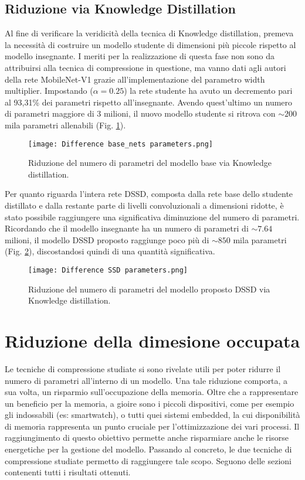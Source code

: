 \subsection{Riduzione via Knowledge Distillation}
Al fine di verificare la veridicità della tecnica di Knowledge distillation, premeva la necessità di costruire un modello studente di dimensioni più piccole rispetto al modello insegnante. I meriti per la realizzazione di questa fase non sono da attribuirsi alla tecnica di compressione in questione, ma vanno dati agli autori della rete MobileNet-V1 grazie all'implementazione del parametro width multiplier.
Impostando  ($\alpha=0.25$) la rete studente ha avuto un decremento pari al 93,31\% dei parametri rispetto all'insegnante. Avendo quest'ultimo un numero di parametri maggiore di 3 milioni, il nuovo modello studente si ritrova con $\sim{200}$ mila parametri allenabili (Fig. \ref{base_net_par}).
\begin{figure}
    \centering
    \texttt{[image: Difference base\_nets parameters.png]}
    \centering
    \caption{Riduzione del numero di parametri del modello base via Knowledge distillation.}
    \label{base_net_par}
\end{figure}
Per quanto riguarda l'intera rete DSSD, composta dalla rete base dello studente distillato e dalla restante parte di livelli convoluzionali a dimensioni ridotte, è stato possibile raggiungere una significativa diminuzione del numero di parametri. Ricordando che il modello insegnante ha un numero di parametri di $\sim{7.64}$ milioni, il modello DSSD proposto raggiunge poco più di $\sim{850}$ mila parametri (Fig. \ref{SSD_par}), discostandosi quindi di una quantità significativa.
\begin{figure}
    \centering
    \texttt{[image: Difference SSD parameters.png]}
    \centering
    \caption{Riduzione del numero di parametri del modello proposto DSSD via Knowledge distillation.}
    \label{SSD_par}
\end{figure}

\section{Riduzione della dimesione occupata}
Le tecniche di compressione studiate si sono rivelate utili per poter ridurre il numero di parametri all'interno di un modello. Una tale riduzione comporta, a sua volta, un risparmio sull'occupazione della memoria. Oltre che a rappresentare un beneficio per la memoria, a gioire sono i piccoli dispositivi, come per esempio gli indossabili (es: smartwatch), o tutti quei sistemi embedded, la cui disponibilità di memoria rappresenta un punto cruciale per l'ottimizzazione dei vari processi. Il raggiungimento di questo obiettivo permette anche risparmiare anche le risorse energetiche  per la gestione del modello. Passando al concreto, le due tecniche di compressione studiate permetto di raggiungere tale scopo. Seguono delle sezioni contenenti tutti i risultati ottenuti.
